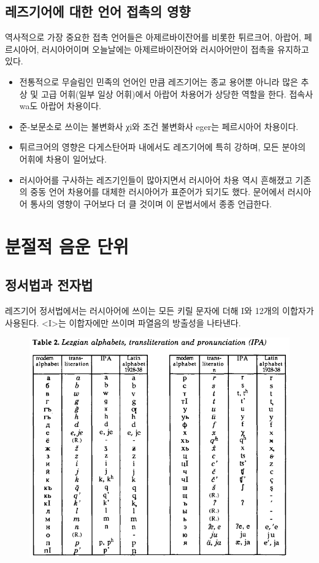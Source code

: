 \subsection{레즈기어에 대한 언어 접촉의 영향}
역사적으로 가장 중요한 접촉 언어들은 아제르바이잔어를 비롯한 튀르크어, 아랍어, 페르시아어, 러시아어이며 오늘날에는 아제르바이잔어와 러시아어만이 접촉을 유지하고 있다.
\begin{itemize}
	\item 전통적으로 무슬림인 민족의 언어인 만큼 레즈기어는 종교 용어뿐 아니라 많은 추상 및 고급 어휘(일부 일상 어휘)에서 아랍어 차용어가 상당한 역할을 한다. 접속사 wa도 아랍어 차용이다.
	\item 준-보문소로 쓰이는 불변화사 χi와 조건 불변화사 eger는 페르시아어 차용이다.
	\item 튀르크어의 영향은 다게스탄어파 내에서도 레즈기어에 특히 강하며, 모든 분야의 어휘에 차용이 일어났다.
	\item 러시아어를 구사하는 레즈기인들이 많아지면서 러시아어 차용 역시 흔해졌고 기존의 중동 언어 차용어를 대체한 러시아어가 표준어가 되기도 했다. 문어에서 러시아어 통사의 영향이 구어보다 더 클 것이며 이 문법서에서 종종 언급한다.
\end{itemize}


\section{분절적 음운 단위}
\subsection{정서법과 전자법}
레즈기어 정서법에서는 러시아어에 쓰이는 모든 키릴 문자에 더해 I와 12개의 이합자가 사용된다. <I>는 이합자에만 쓰이며 파열음의 방출성을 나타낸다.
\begin{figure}[h]
\begin{center}
\includegraphics{Lezgian/src/lezalpha}
\end{center}
\label{레즈기어 알파벳}
\end{figure}
